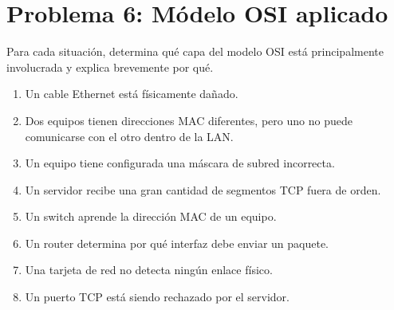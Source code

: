 \section{Problema 6: Módelo OSI aplicado}

\begin{tcolorbox}[enunciado]
Para cada situación, determina qué capa del modelo OSI está principalmente involucrada y explica brevemente por qué.
\begin{enumerate}[label=(\alph*), leftmargin=*]
    \item Un cable Ethernet está físicamente dañado.
    \item Dos equipos tienen direcciones MAC diferentes, pero uno no puede comunicarse con el otro dentro de la LAN.
    \item Un equipo tiene configurada una máscara de subred incorrecta.
    \item Un servidor recibe una gran cantidad de segmentos TCP fuera de orden.
    \item Un switch aprende la dirección MAC de un equipo.
    \item Un router determina por qué interfaz debe enviar un paquete.
    \item Una tarjeta de red no detecta ningún enlace físico.
    \item Un puerto TCP está siendo rechazado por el servidor.
\end{enumerate}
\end{tcolorbox}


